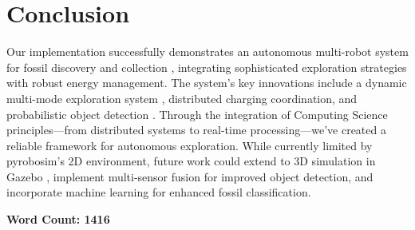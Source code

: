 \documentclass{csfourzero}
\begin{document}
\section{Conclusion}
Our implementation successfully demonstrates an autonomous multi-robot system for fossil discovery and collection \cite{burgard2002coordinated}, integrating sophisticated exploration strategies with robust energy management. The system's key innovations include a dynamic multi-mode exploration system \cite{LaValle1998}, distributed charging coordination, and probabilistic object detection \cite{Thrun2003}. Through the integration of Computing Science principles—from distributed systems to real-time processing—we've created a reliable framework for autonomous exploration. While currently limited by pyrobosim's \cite{pyrobosim-docs} 2D environment, future work could extend to 3D simulation in Gazebo \cite{quigley2009ros}, implement multi-sensor fusion for improved object detection, and incorporate machine learning for enhanced fossil classification.

\vspace{30}
\noindent \textbf{Word Count: 1416}

\newpage


\end{document}
